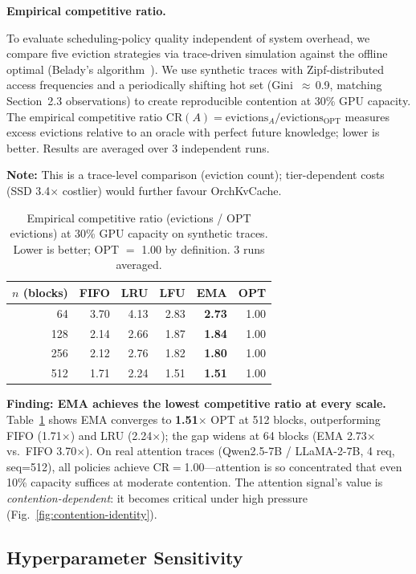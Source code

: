 \documentclass[conference]{IEEEtran}
\begin{document}
\textbf{Empirical competitive ratio.}

To evaluate scheduling-policy quality independent of system overhead, we compare five eviction strategies via trace-driven simulation against the offline optimal (Belady's algorithm~\cite{sleator-tarjan}). We use synthetic traces with Zipf-distributed access frequencies and a periodically shifting hot set (Gini~$\approx$\,0.9, matching Section~2.3 observations) to create reproducible contention at 30\% GPU capacity. The empirical competitive ratio $\text{CR}(A) = \text{evictions}_A / \text{evictions}_{\text{OPT}}$ measures excess evictions relative to an oracle with perfect future knowledge; lower is better. Results are averaged over 3 independent runs.

\textbf{Note:} This is a trace-level comparison (eviction count); tier-dependent costs (SSD 3.4$\times$ costlier) would further favour OrchKvCache.

\begin{table}[t]
\centering
\caption{Empirical competitive ratio (evictions / OPT evictions) at 30\% GPU capacity on synthetic traces. Lower is better; OPT $=$ 1.00 by definition. 3 runs averaged.}
\label{tab:cr}
\small
\begin{tabular}{@{}rrrrrr@{}}
\toprule
$n$ (blocks) & FIFO & LRU & LFU & \textbf{EMA} & OPT \\
\midrule
64  & 3.70 & 4.13 & 2.83 & \textbf{2.73} & 1.00 \\
128 & 2.14 & 2.66 & 1.87 & \textbf{1.84} & 1.00 \\
256 & 2.12 & 2.76 & 1.82 & \textbf{1.80} & 1.00 \\
512 & 1.71 & 2.24 & 1.51 & \textbf{1.51} & 1.00 \\
\bottomrule
\end{tabular}
\end{table}

\textbf{Finding: EMA achieves the lowest competitive ratio at every scale.} Table~\ref{tab:cr} shows EMA converges to \textbf{1.51$\times$} OPT at 512 blocks, outperforming FIFO (1.71$\times$) and LRU (2.24$\times$); the gap widens at 64 blocks (EMA 2.73$\times$ vs.\ FIFO 3.70$\times$). On real attention traces (Qwen2.5-7B / LLaMA-2-7B, 4 req, seq=512), all policies achieve CR$=$1.00---attention is so concentrated that even 10\% capacity suffices at moderate contention. The attention signal's value is \emph{contention-dependent}: it becomes critical under high pressure (Fig.~\ref{fig:contention-identity}).

\subsection{Hyperparameter Sensitivity}
\label{sec:hyperparam}
\end{document}
